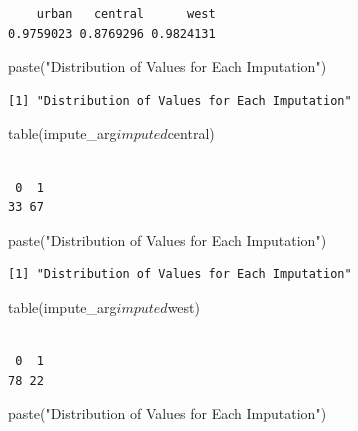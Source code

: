 \documentclass[]{article}
\newenvironment{Shaded}{}{}
\newcommand{\KeywordTok}[1]{\textcolor[rgb]{0.00,0.00,1.00}{#1}}
\newcommand{\NormalTok}[1]{#1}
\newcommand{\OperatorTok}[1]{#1}
\newcommand{\StringTok}[1]{\textcolor[rgb]{0.00,0.50,0.50}{#1}}
\begin{document}
\begin{verbatim}
    urban   central      west 
0.9759023 0.8769296 0.9824131 
\end{verbatim}

\begin{Shaded}
\begin{Highlighting}[]
\KeywordTok{paste}\NormalTok{(}\StringTok{"Distribution of Values for Each Imputation"}\NormalTok{)}
\end{Highlighting}
\end{Shaded}

\begin{verbatim}
[1] "Distribution of Values for Each Imputation"
\end{verbatim}

\begin{Shaded}
\begin{Highlighting}[]
\KeywordTok{table}\NormalTok{(impute_arg}\OperatorTok{$}\NormalTok{imputed}\OperatorTok{$}\NormalTok{central)}
\end{Highlighting}
\end{Shaded}

\begin{verbatim}

 0  1 
33 67 
\end{verbatim}

\begin{Shaded}
\begin{Highlighting}[]
\KeywordTok{paste}\NormalTok{(}\StringTok{"Distribution of Values for Each Imputation"}\NormalTok{)}
\end{Highlighting}
\end{Shaded}

\begin{verbatim}
[1] "Distribution of Values for Each Imputation"
\end{verbatim}

\begin{Shaded}
\begin{Highlighting}[]
\KeywordTok{table}\NormalTok{(impute_arg}\OperatorTok{$}\NormalTok{imputed}\OperatorTok{$}\NormalTok{west)}
\end{Highlighting}
\end{Shaded}

\begin{verbatim}

 0  1 
78 22 
\end{verbatim}

\begin{Shaded}
\begin{Highlighting}[]
\KeywordTok{paste}\NormalTok{(}\StringTok{"Distribution of Values for Each Imputation"}\NormalTok{)}
\end{Highlighting}
\end{Shaded}
\end{document}
